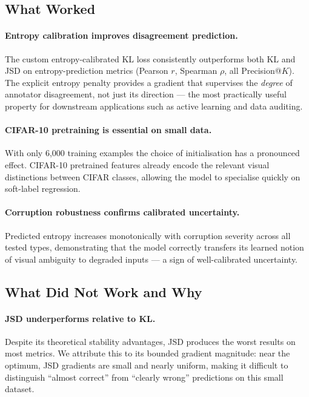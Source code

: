 \documentclass[11pt,a4paper]{article}
\begin{document}
\subsection{What Worked}

\paragraph{Entropy calibration improves disagreement prediction.}
The custom entropy-calibrated KL loss consistently outperforms both KL and JSD
on entropy-prediction metrics (Pearson $r$, Spearman $\rho$, all
Precision@$K$).
The explicit entropy penalty provides a gradient that supervises the
\emph{degree} of annotator disagreement, not just its direction — the most
practically useful property for downstream applications such as active
learning and data auditing.

\paragraph{CIFAR-10 pretraining is essential on small data.}
With only 6,000 training examples the choice of initialisation has a
pronounced effect.
CIFAR-10 pretrained features already encode the relevant visual distinctions
between CIFAR classes, allowing the model to specialise quickly on soft-label
regression.

\paragraph{Corruption robustness confirms calibrated uncertainty.}
Predicted entropy increases monotonically with corruption severity across all
tested types, demonstrating that the model correctly transfers its learned
notion of visual ambiguity to degraded inputs — a sign of well-calibrated
uncertainty.

\subsection{What Did Not Work and Why}

\paragraph{JSD underperforms relative to KL.}
Despite its theoretical stability advantages, JSD produces the worst results
on most metrics.
We attribute this to its bounded gradient magnitude: near the optimum, JSD
gradients are small and nearly uniform, making it difficult to distinguish
``almost correct'' from ``clearly wrong'' predictions on this small dataset.
\end{document}
